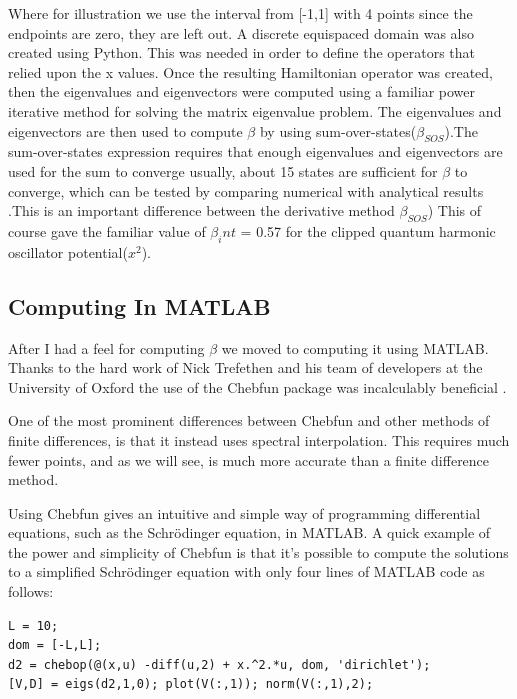 \documentclass{report}
\theoremstyle{definition}
\begin{document}
Where for illustration we use the interval from [-1,1] with 4 points since the endpoints are zero, they are left out. 
A discrete equispaced domain was also created using Python. This was needed in order to define the operators that relied upon the x values. Once the resulting Hamiltonian operator was created,  then the eigenvalues and eigenvectors were computed using a familiar power iterative method for solving the matrix eigenvalue problem. The eigenvalues and eigenvectors are then used to compute $\beta$ by using sum-over-states($\beta_{SOS}$)\cite{kuzyk2005compact, orr1971perturbation}.The sum-over-states expression requires that enough eigenvalues and eigenvectors are used for the sum to converge usually, about 15 states are sufficient for $\beta$ to converge, which can be tested by comparing numerical with analytical results \cite{kuzyk2005compact}.This is an important difference between the derivative method $\beta_{SOS}$)  This of course gave the familiar value of $\beta_int$ = 0.57 for the  clipped quantum harmonic oscillator potential($x^2$). %

\subsection*{Computing In MATLAB}
After I had a feel for computing $\beta$ we moved to computing it using MATLAB. Thanks to the hard work of Nick Trefethen and his team of developers at the University of Oxford the use of the Chebfun package was incalculably beneficial \cite{chebfun}.

One of the most prominent differences between Chebfun and other methods of finite differences, is that it instead uses spectral interpolation. This requires much fewer points, and as we will see, is much more accurate than a finite difference method\cite{trefethen2000spectral}. 

Using Chebfun gives an intuitive and simple way of programming differential equations, such as the Schr\"odinger equation, in MATLAB. A quick example of the power and simplicity of Chebfun is that it's possible to compute the solutions to a simplified Schr\"odinger equation with only four lines of MATLAB code as follows: 


\bigskip

\begin{minipage}{5in}
\noindent
\begin{verbatim}
L = 10;
dom = [-L,L];
d2 = chebop(@(x,u) -diff(u,2) + x.^2.*u, dom, 'dirichlet');
[V,D] = eigs(d2,1,0); plot(V(:,1)); norm(V(:,1),2);
\end{verbatim}
\end{minipage}
\end{document}
